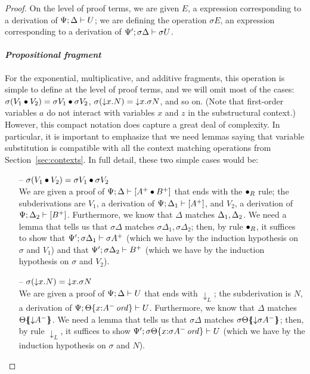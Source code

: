 \begin{proof}
On the level of proof terms, 
we are given $E$, a expression corresponding to a derivation of
${\Psi};{\Delta} \vdash {U}$; we are defining the operation $\sigma{E}$,
an expression corresponding to a derivation of 
${\Psi'};{\sigma\Delta} \vdash {\sigma{U}}$.

\paragraph{\it Propositional fragment}
For the exponential, multiplicative, and additive fragments, this
operation is simple to define at the level of proof terms, and we will
omit most of the cases: $\sigma({V_1} \mathbin{\bullet} {V_2}) =
{\sigma{V_1}} \mathbin{\bullet} {\sigma{V_2}}$, $\sigma({\downarrow}{x}.{N}) =
{\downarrow}{x}.{\sigma N}$, and so on. (Note that first-order variables
$a$ do not interact with variables $x$ and $z$ in the substructural
context.) However, this compact notation does
capture a great deal of complexity. In particular, it is important to
emphasize that we need lemmas saying that variable substitution is
compatible with all the context matching operations from
Section~\ref{sec:contexts}.  In full detail, these two simple cases
would be:

\begin{itemize}

\item[--]
$\sigma({V_1} \mathbin{\bullet} {V_2}) = {\sigma{V_1}} \mathbin{\bullet} {\sigma{V_2}}$\smallskip\\
We are given a proof of ${\Psi};{\Delta} \vdash {[A^+ \mathbin{\bullet}B^+]}$ that
ends with the ${\mathbin{\bullet}}_R$ rule; the subderivations are
$V_1$, a derivation of ${\Psi};{\Delta_1} \vdash {[A^+]}$, and
$V_2$, a derivation of ${\Psi};{\Delta_2} \vdash {[B^+]}$. Furthermore, we know that
$\Delta$ matches ${\Delta_1},{\Delta_2}$. We need a lemma that
tells us that $\sigma\Delta$ matches $\sigma\Delta_1, \sigma\Delta_2$;
then, by rule ${\mathbin{\bullet}}_R$, it suffices to show that
${\Psi'};{\sigma\Delta_1} \vdash {\sigma{A^+}}$ (which we have by the 
induction hypothesis on $\sigma$ and $V_1$) and that
${\Psi'};{\sigma\Delta_2} \vdash {B^+}$ (which we have by the induction hypothesis
on $\sigma$ and $V_2$). \smallskip

\item[--]
$\sigma({\downarrow}{x}.{N}) = {\downarrow}{x}.{\sigma N}$ \smallskip\\ 
We are given a proof
of ${\Psi};{\Delta} \vdash {U}$ that ends with ${\downarrow}_L$; 
the subderivation is $N$, a derivation of
${\Psi};{{\Theta}\{{x{:}{A^-}\,{{\it ord}}}\}} \vdash {U}$. Furthermore, we know that
$\Delta$ matches ${\Theta}\mbox{$\{\hspace{-4pt}\{$}{{\downarrow}A^-}\mbox{$\}\hspace{-4pt}\}$}$. We need a lemma
that tells us that $\sigma\Delta$ matches
${\sigma\Theta}\mbox{$\{\hspace{-4pt}\{$}{{\downarrow}\sigma A^-}\mbox{$\}\hspace{-4pt}\}$}$; then, by 
rule ${\downarrow}_L$, it suffices to show 
${\Psi'};{{\sigma\Theta}\{{x{:}{\sigma{A^-}}\,{{\it ord}}}\}} \vdash {U}$ (which
we have by the induction hypothesis on $\sigma$ and $N$).


\end{itemize}
\end{proof}
